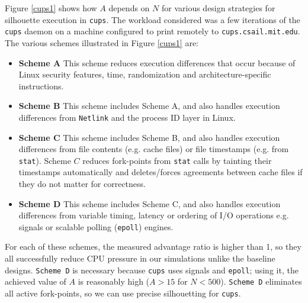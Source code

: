 \newpage
Figure \ref{cups1} shows how $A$ depends on $N$ for various design
strategies for silhouette execution in \texttt{cups}. The workload
considered was a few iterations of the \texttt{cups} daemon on a 
machine configured to print remotely to \texttt{cups.csail.mit.edu}.
The various schemes illustrated in Figure \ref{cups1} are:
\begin{itemize}
\item {\bf Scheme A} \newline
  This scheme reduces execution differences that occur because of Linux security
  features, time, randomization and architecture-specific instructions.
\item {\bf Scheme B} \newline
  This scheme includes Scheme A, and also handles execution
  differences from \texttt{Netlink} and the process ID layer
  in Linux.
\item {\bf Scheme C} \newline
  This scheme includes Scheme B, and also handles execution
  differences from file contents (e.g. cache files)
  or file timestamps (e.g. from \texttt{stat}).
  Scheme $C$ reduces fork-points from \texttt{stat}
  calls by tainting their timestamps automatically
  and deletes/forces agreements between cache
  files if they do not matter for correctness.

\item {\bf Scheme D} \newline
  This scheme includes Scheme C, and also handles execution
  differences from variable timing,
  latency or ordering of I/O operations e.g.
  signals or scalable polling (\texttt{epoll})
  engines.
\end{itemize}
For each of these schemes, the measured advantage ratio
is higher than 1, so they all successfully reduce CPU
pressure in our simulations unlike the baseline designs.
\texttt{Scheme D} is necessary because \texttt{cups}
uses signals and \texttt{epoll}; using it,
the achieved value of $A$ is reasonably high ($A > 15$
for $N < 500$). \texttt{Scheme D} eliminates
all active fork-points, so we can
use precise silhouetting 
for \texttt{cups}. 

